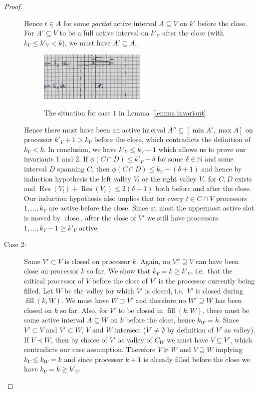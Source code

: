 \documentclass[a4paper]{article}
\DeclareMathOperator{\fillop}{fill}
\DeclareMathOperator{\close}{close}
\DeclareMathOperator{\res}{Res}
\begin{document}
\begin{proof}
\begin{description}
      Hence $t \in A$ for some  \emph{partial} active interval $A \subseteq V$ on $k'$ before the close.
      For $A' \subseteq V$ to be a full active interval on $k'_V$ after the close (with $k_V \leq k'_V < k$), we must have $A' \subseteq A$.
      \begin{figure}[H]
        \centering
        \includegraphics[width=0.5\textwidth]{graphics/sketches/invariant_case1.png}\label{fig:invariant_case1}
        \caption{The situation for case $1$ in Lemma~\ref{lemma:invariant}.}
      \end{figure}
      Hence there must have been an active interval $A'' \subseteq [\min A', \max A]$ on processor $k'_V + 1 > k_V$ before the close, which contradicts the definition of $k_V < k$.
      In conclusion, we have $k'_V \leq k_V - 1$ which allows us to prove our invariants 1 and 2.
      If $\phi(C \cap D) \leq k'_{V} - \delta$ for some $\delta \in \mathbb{N}$ and some interval $D$ spanning $C$, then $\phi(C \cap D) \leq k_V - (\delta + 1)$ and hence by induction hypothesis the left valley $V_l$ or the right valley $V_r$ for $C, D$ exists and $\res(V_l) + \res(V_r) \leq 2 (\delta + 1)$ both before and after the close.
      Our induction hypothesis also implies that for every $t \in C \cap V$ processors $1, \ldots, k_V$ are active before the close.
      Since at most the uppermost active slot is moved by $\close$, after the close of $V'$ we still have processors $1, \ldots, k_V - 1 \geq k'_V$ active.

    \item[Case 2:]
      Some $V' \subset V$ is closed on processor $k$.
      Again, no $V'' \supseteq V$ can have been close on processor $k$ so far.
      We show that $k_V = k \geq k'_V$, i.e.\ that the critical processor of $V$ before the close of $V'$ is the processor currently being filled.
      Let $W$ be the valley for which $V'$ is closed, i.e.\ $V'$ is closed during $\fillop(k, W)$.
      We must have $W \supset V'$ and therefore no $W' \supseteq W$ has been closed on $k$ so far.
      Also, for $V'$ to be closed in $\fillop(k, W)$, there must be some active interval $A \subseteq W$ on $k$ before the close, hence $k_W = k$.
      Since $V' \subset V$ and $V' \subset W$, $V$ and $W$ intersect ($V' \neq \emptyset$ by definition of $V'$ as valley).
      If $V \prec W$, then by choice of $V'$ as valley of $C_W$
      we must have $V \subseteq V'$, which contradicts our case assumption.
      Therefore $V \succeq W$ and $V \supseteq W$ implying $k_V \leq k_W = k$ and since processor $k+1$ is already filled before the close we have $k_V = k \geq k'_V$.


\end{description}
\end{proof}
\end{document}
